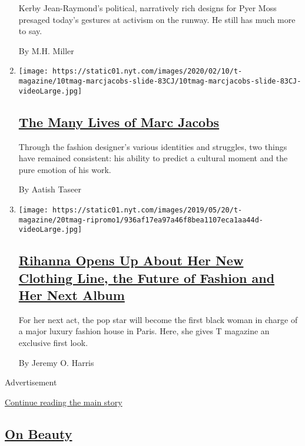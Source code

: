\begin{enumerate}
  Kerby Jean-Raymond's political, narratively rich designs for Pyer Moss
  presaged today's gestures at activism on the runway. He still has much
  more to say.

  By M.H. Miller
\item
  \texttt{[image: https://static01.nyt.com/images/2020/02/10/t-magazine/10tmag-marcjacobs-slide-83CJ/10tmag-marcjacobs-slide-83CJ-videoLarge.jpg]}

  \hypertarget{the-many-lives-of-marc-jacobs}{%
  \subsection{\texorpdfstring{\href{/2020/02/10/t-magazine/marc-jacobs.html}{The
  Many Lives of Marc
  Jacobs}}{The Many Lives of Marc Jacobs}}\label{the-many-lives-of-marc-jacobs}}

  Through the fashion designer's various identities and struggles, two
  things have remained consistent: his ability to predict a cultural
  moment and the pure emotion of his work.

  By Aatish Taseer
\item
  \texttt{[image: https://static01.nyt.com/images/2019/05/20/t-magazine/20tmag-ripromo1/936af17ea97a46f8bea1107eca1aa44d-videoLarge.jpg]}

  \hypertarget{rihanna-opens-up-about-her-new-clothing-line-the-future-of-fashion-and-her-next-album}{%
  \subsection{\texorpdfstring{\href{/interactive/2019/05/20/t-magazine/rihanna-fenty-louis-vuitton.html}{Rihanna
  Opens Up About Her New Clothing Line, the Future of Fashion and Her
  Next
  Album}}{Rihanna Opens Up About Her New Clothing Line, the Future of Fashion and Her Next Album}}\label{rihanna-opens-up-about-her-new-clothing-line-the-future-of-fashion-and-her-next-album}}

  For her next act, the pop star will become the first black woman in
  charge of a major luxury fashion house in Paris. Here, she gives T
  magazine an exclusive first look.

  By Jeremy O. Harris
\end{enumerate}

Advertisement

\protect\hyperlink{after-mid1}{Continue reading the main story}

\hypertarget{on-beauty-1}{%
\subsection{\texorpdfstring{\href{/column/on-beauty}{On
Beauty}}{On Beauty}}\label{on-beauty-1}}

